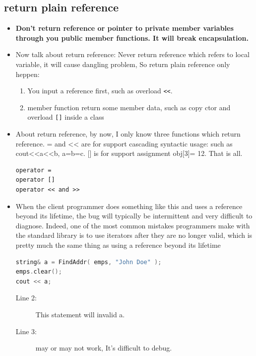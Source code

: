 \documentclass[a4paper,11pt,twoside]{book}
\begin{document}
\subsection{return plain reference} 
\begin{itemize}
	\item \textbf{Don't return reference or pointer to private member variables through you public member functions. It will break encapsulation. }
	
	\item Now talk about return reference: Never return reference which refers to local variable, it will cause dangling problem, So return plain reference only heppen:
	\begin{enumerate}
		\item You input a reference first, such as overload \verb=<<=.
		\item member function return some member data, such as copy ctor and overload \verb=[]= inside a class
	\end{enumerate}
	
	\item About return reference, by now, I only know three functions which return reference. = and << are for support cascading syntactic usage: such as cout<<a<<b, a=b=c.  [] is for support assignment obj[3]= 12.  That is all.
\begin{lstlisting}[numbers=none]
operator =
operator []
operator << and >>
\end{lstlisting}
	
	\item  When the client programmer does something like this and uses a reference beyond its lifetime, the bug will typically be intermittent and very difficult to diagnose. Indeed, one of the most common mistakes programmers make with the standard library is to use iterators after they are no longer valid, which is pretty much the same thing as using a reference beyond its lifetime
	
\begin{lstlisting}[frame=single, language=c++, mathescape=true]
string& a = FindAddr( emps, "John Doe" );
emps.clear(); 
cout << a; 
\end{lstlisting}
\begin{description}
	\item[Line 2:] This statement will invalid a.
	\item[Line 3:] may or may not work, It's difficult to debug.
\end{description}
	

\end{itemize}
\end{document}

